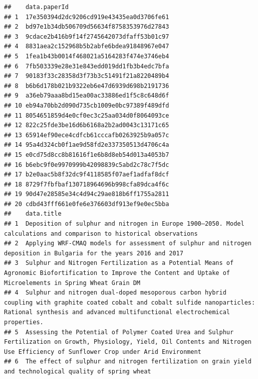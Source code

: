 \documentclass[
]{article}
\begin{document}
\begin{verbatim}
##    data.paperId                            
## 1  17e350394d2dc9206cd919e43435ea0d3706fe61
## 2  bd97e1b34db506709d56634f8758353976d27843
## 3  9cdace2b416b9f14f2745642073dfaff53b01c97
## 4  8831aea2c152968b5b2abfe6bdea91848967e047
## 5  1fea1b43b0014f468021a5164283f474e3746eb4
## 6  7fb503339e28e31e843edd019dd1fb3b4edc7bfa
## 7  90183f33c28358d3f73b3c51491f21a8220489b4
## 8  b6b6d178b021b9322eb6e47d6939d698b2191736
## 9  a36eb79aaa8bd15ea00ac33886ed1f5c8c648d6f
## 10 eb94a70bb2d090d735cb1009e0bc97389f489dfd
## 11 8054651859d4e0cf0ec3c25aa034d0f8064093ce
## 12 822c25fde3be16d6b6168a2b2ad0043c13171c65
## 13 65914ef90ece4cdfcb61cccafb0263925b9a057c
## 14 95a4d324cb0f1ae9d58fd2e337350513d4706c4a
## 15 e0cd75d8cc8b81616f1e6b8d8eb54d013a4053b7
## 16 b6ebc9f0e9970999b42098839c5abd2c78c7f5dc
## 17 b2e0aac5b8f32dc9f4118585f07aef1adfaf8dcf
## 18 8729f7fbfbaf130718964696b998cfa89dca4f6c
## 19 90d47e28585e34c4d94c29ae818b6ff1755a2811
## 20 cdbd43fff661e0fe6e376603df913ef9e0ec5bba
##    data.title                                                                                                                                                                                                                                    
## 1  Deposition of sulphur and nitrogen in Europe 1900–2050. Model calculations and comparison to historical observations                                                                                                                          
## 2  Applying WRF-CMAQ models for assessment of sulphur and nitrogen deposition in Bulgaria for the years 2016 and 2017                                                                                                                            
## 3  Sulphur and Nitrogen Fertilization as a Potential Means of Agronomic Biofortification to Improve the Content and Uptake of Microelements in Spring Wheat Grain DM                                                                             
## 4  Sulphur and nitrogen dual-doped mesoporous carbon hybrid coupling with graphite coated cobalt and cobalt sulfide nanoparticles: Rational synthesis and advanced multifunctional electrochemical properties.                                   
## 5  Assessing the Potential of Polymer Coated Urea and Sulphur Fertilization on Growth, Physiology, Yield, Oil Contents and Nitrogen Use Efficiency of Sunflower Crop under Arid Environment                                                      
## 6  The effect of sulphur and nitrogen fertilization on grain yield and technological quality of spring wheat                                                                                                                                     

\end{verbatim}
\end{document}
